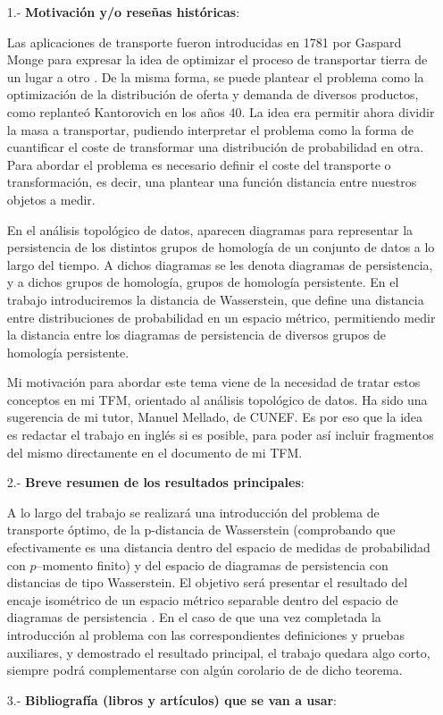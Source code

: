 \documentclass[11pt,a4paper,draft]{article}
\begin{document}
\begin{enumerate}

\item[1.-] {\bf  Motivación y/o reseñas históricas}:

Las aplicaciones de transporte fueron introducidas en 1781 por Gaspard Monge para expresar la idea de optimizar el proceso de transportar tierra de un lugar a otro \cite[1.1 Historical overview]{Figalli}. De la misma forma, se puede plantear el problema como la optimización de la distribución de oferta y demanda de diversos productos, como replanteó Kantorovich en los años 40. La idea era permitir ahora dividir la masa a transportar, pudiendo interpretar el problema como la forma de cuantificar el coste de transformar una distribución de probabilidad en otra. Para abordar el problema es necesario definir el coste del transporte o transformación, es decir, una plantear una función distancia entre nuestros objetos a medir.

En el análisis topológico de datos, aparecen diagramas para representar la persistencia de los distintos grupos de homología de un conjunto de datos a lo largo del tiempo. A dichos diagramas se les denota diagramas de persistencia, y a dichos grupos de homología, grupos de homología persistente. En el trabajo introduciremos la distancia de Wasserstein, que define una distancia entre distribuciones de probabilidad en un espacio métrico, permitiendo medir la distancia entre los diagramas de persistencia de diversos grupos de homología persistente.

Mi motivación para abordar este tema viene de la necesidad de tratar estos conceptos en mi TFM, orientado al análisis topológico de datos. Ha sido una sugerencia de mi tutor, Manuel Mellado, de CUNEF. Es por eso que la idea es redactar el trabajo en inglés si es posible, para poder así incluir fragmentos del mismo directamente en el documento de mi TFM.

\item[2.-] {\bf Breve resumen de los resultados principales}:

A lo largo del trabajo se realizará una introducción del problema de transporte óptimo, de la p-distancia de Wasserstein (comprobando que efectivamente es una distancia dentro del espacio de medidas de probabilidad con $p$--momento finito) y del espacio de diagramas de persistencia con distancias de tipo Wasserstein. El objetivo será presentar el resultado del encaje isométrico de un espacio métrico separable dentro del espacio de diagramas de persistencia \cite[Theorem 19]{Bubenik}. En el caso de que una vez completada la introducción al problema con las correspondientes definiciones y pruebas auxiliares, y demostrado el resultado principal, el trabajo quedara algo corto, siempre podrá complementarse con algún corolario de de dicho teorema.

\newpage
\item[3.-] {\bf Bibliografía (libros y artículos) que se van a usar}: 
\end{enumerate}
\end{document}
